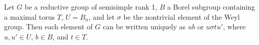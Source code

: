 Let $G$ be a reductive group of semisimple rank 1, $B$ a Borel subgroup containing a maximal torus $T$, $U = B_u$, and let $\sigma$ be the nontrivial element of the Weyl group. Then each element of $G$ can be written uniquely as $u b$ or $u \sigma t u'$, where $u, u' \in U$, $b \in B$, and $t \in T$.
